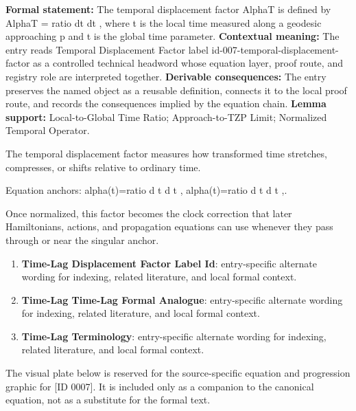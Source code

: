 \begingroup\footnotesize\setlength{\emergencystretch}{3em}\sloppy
\textbf{Formal statement:} The temporal displacement factor AlphaT is defined by AlphaT = ratio dt dt , where t is the local time measured along a geodesic approaching p and t is the global time parameter. \textbf{Contextual meaning:} The entry reads Temporal Displacement Factor label id-007-temporal-displacement-factor as a controlled technical headword whose equation layer, proof route, and registry role are interpreted together. \textbf{Derivable consequences:} The entry preserves the named object as a reusable definition, connects it to the local proof route, and records the consequences implied by the equation chain. \textbf{Lemma support:} Local-to-Global Time Ratio; Approach-to-TZP Limit; Normalized Temporal Operator.\par
\endgroup

The temporal displacement factor measures how transformed time stretches, compresses, or shifts relative to ordinary time.

Equation anchors: alpha(t)=ratio d t d t , alpha(t)=ratio d t d t ,.

Once normalized, this factor becomes the clock correction that later Hamiltonians, actions, and propagation equations can use whenever they pass through or near the singular anchor.
\endgroup

\begingroup\footnotesize\sloppy
\begin{enumerate}[leftmargin=1.35em,itemsep=1pt,topsep=1pt,parsep=0pt]
\item \textbf{Time-Lag Displacement Factor Label Id}: entry-specific alternate wording for indexing, related literature, and local formal context.
\item \textbf{Time-Lag Time-Lag Formal Analogue}: entry-specific alternate wording for indexing, related literature, and local formal context.
\item \textbf{Time-Lag Terminology}: entry-specific alternate wording for indexing, related literature, and local formal context.
\end{enumerate}
\endgroup

\begingroup\footnotesize\sloppy
The visual plate below is reserved for the source-specific equation and progression graphic for [ID 0007]. It is included only as a companion to the canonical equation, not as a substitute for the formal text.
\par\endgroup
\ifTZPDarkEdition
{}
\fi

